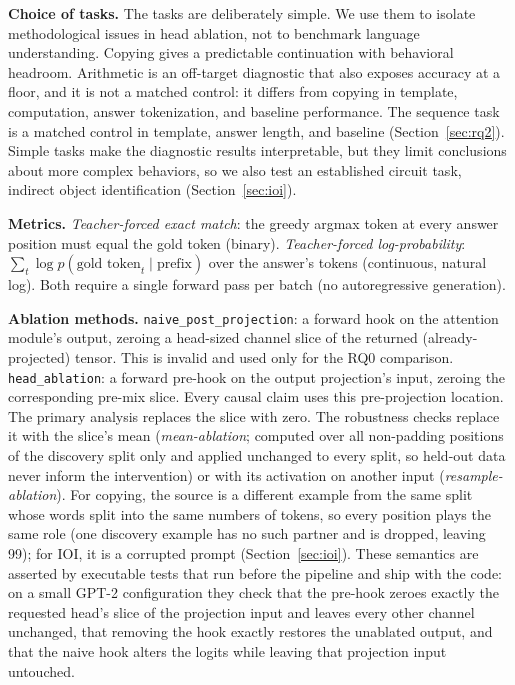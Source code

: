 \documentclass{article}
\begin{document}
\textbf{Choice of tasks.} The tasks are deliberately simple. We use them
to isolate methodological issues in head ablation, not to benchmark
language understanding. Copying gives a predictable continuation with
behavioral headroom. Arithmetic is an off-target diagnostic that also
exposes accuracy at a floor, and it is not a matched control: it differs
from copying in template, computation, answer tokenization, and baseline
performance. The sequence task is a matched control in template,
answer length, and baseline (Section~\ref{sec:rq2}). Simple tasks make
the diagnostic results interpretable, but they limit conclusions about
more complex behaviors, so we also test an established circuit task,
indirect object identification (Section~\ref{sec:ioi}).

\textbf{Metrics.} \emph{Teacher-forced exact match}: the greedy argmax
token at every answer position must equal the gold token (binary).
\emph{Teacher-forced log-probability}: $\sum_t \log p(\text{gold
token}_t \mid \text{prefix})$ over the answer's tokens (continuous,
natural log). Both require a single forward pass per batch (no
autoregressive generation).

\textbf{Ablation methods.} \texttt{naive\_post\_projection}: a forward
hook on the attention module's output, zeroing a head-sized channel
slice of the returned (already-projected) tensor. This is invalid and
used only for the RQ0 comparison. \texttt{head\_ablation}: a forward
pre-hook on the output projection's input, zeroing the corresponding
pre-mix slice. Every causal claim uses this pre-projection location.
The primary analysis replaces the slice with zero. The robustness checks
replace it with the slice's mean (\emph{mean-ablation}; computed over all
non-padding positions of the discovery split only and applied unchanged
to every split, so held-out data never inform the intervention) or with
its activation on another input (\emph{resample-ablation}). For copying,
the source is a different example from the same split whose words split
into the same numbers of tokens, so every position plays the same role
(one discovery example has no such partner and is dropped, leaving 99);
for IOI, it is a corrupted prompt (Section~\ref{sec:ioi}). These semantics are asserted by
executable tests that run before the pipeline and ship with the code: on a
small GPT-2 configuration they check that the pre-hook zeroes exactly the
requested head's slice of the projection input and leaves every other
channel unchanged, that removing the hook exactly restores the unablated
output, and that the naive hook alters the logits while leaving that
projection input untouched.
\end{document}
